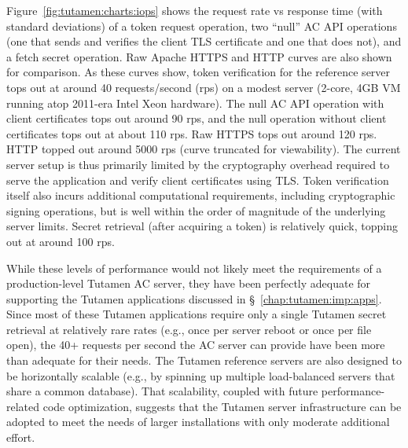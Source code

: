 Figure~\ref{fig:tutamen:charts:iops} shows the request rate vs
response time (with standard deviations) of a token request operation,
two ``null'' AC API operations (one that sends and verifies the client
TLS certificate and one that does not), and a fetch secret
operation. Raw Apache HTTPS and HTTP curves are also shown for
comparison. As these curves show, token verification for the reference
server tops out at around 40 requests/second (rps) on a modest server
(2-core, 4GB VM running atop 2011-era Intel Xeon hardware). The null
AC API operation with client certificates tops out around 90 rps, and
the null operation without client certificates tops out at about 110
rps. Raw HTTPS tops out around 120 rps. HTTP topped out around 5000
rps (curve truncated for viewability). The current server setup is
thus primarily limited by the cryptography overhead required to serve
the application and verify client certificates using TLS. Token
verification itself also incurs additional computational requirements,
including cryptographic signing operations, but is well within the
order of magnitude of the underlying server limits. Secret retrieval
(after acquiring a token) is relatively quick, topping out at around
100 rps.

While these levels of performance would not likely meet the
requirements of a production-level Tutamen AC server, they have been
perfectly adequate for supporting the Tutamen applications discussed
in \S~\ref{chap:tutamen:imp:apps}. Since most of these Tutamen
applications require only a single Tutamen secret retrieval at
relatively rare rates (e.g., once per server reboot or once per file
open), the 40+ requests per second the AC server can provide have been
more than adequate for their needs. The Tutamen reference servers are
also designed to be horizontally scalable (e.g., by spinning up
multiple load-balanced servers that share a common database). That
scalability, coupled with future performance-related code
optimization, suggests that the Tutamen server infrastructure can be
adopted to meet the needs of larger installations with only moderate
additional effort.

